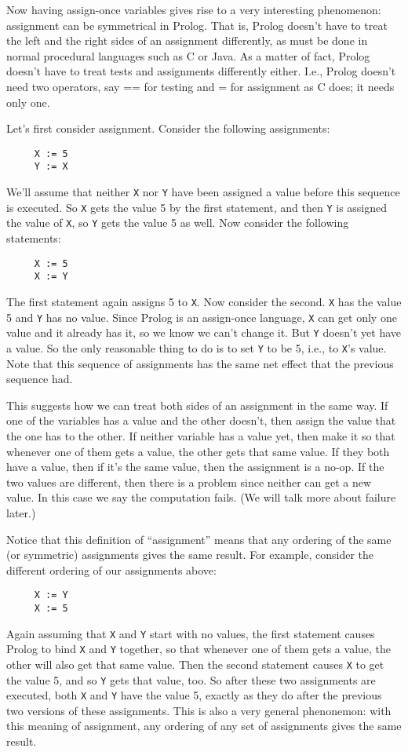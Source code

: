 Now having assign-once variables gives rise to a very interesting
phenomenon: assignment can be symmetrical in Prolog.  That is, Prolog
doesn't have to treat the left and the right sides of an assignment
differently, as must be done in normal procedural languages such as
C or Java.  As a matter of fact, Prolog doesn't have to treat tests
and assignments differently either.  I.e., Prolog doesn't need two
operators, say == for testing and = for assignment as C does; it needs
only one.  

Let's first consider assignment.  Consider the following assignments:
\begin{verbatim}
     X := 5
     Y := X
\end{verbatim}
We'll assume that neither \verb|X| nor \verb|Y| have been assigned a
value before this sequence is executed.  So \verb|X| gets the value 5
by the first statement, and then \verb|Y| is assigned the value of
\verb|X|, so \verb|Y| gets the value 5 as well.  Now consider the
following statements:
\begin{verbatim}
     X := 5
     X := Y
\end{verbatim}
The first statement again assigns 5 to \verb|X|.  Now consider the
second.  \verb|X| has the value 5 and \verb|Y| has no value.  Since
Prolog is an assign-once language, \verb|X| can get only one value and
it already has it, so we know we can't change it.  But \verb|Y|
doesn't yet have a value.  So the only reasonable thing to do is to
set \verb|Y| to be 5, i.e., to \verb|X|'s value.  Note that this
sequence of assignments has the same net effect that the previous
sequence had.

This suggests how we can treat both sides of an assignment in the same
way.  If one of the variables has a value and the other doesn't, then
assign the value that the one has to the other.  If neither variable
has a value yet, then make it so that whenever one of them gets a
value, the other gets that same value.  If they both have a value,
then if it's the same value, then the assignment is a no-op.  If the
two values are different, then there is a problem since neither can
get a new value.  In this case we say the computation fails.  (We will
talk more about failure later.)

Notice that this definition of ``assignment'' means that any ordering
of the same (or symmetric) assignments gives the same result.  For
example, consider the different ordering of our assignments above:
\begin{verbatim}
     X := Y
     X := 5
\end{verbatim}
Again assuming that \verb|X| and \verb|Y| start with no values, the
first statement causes Prolog to bind \verb|X| and \verb|Y| together,
so that whenever one of them gets a value, the other will also get
that same value.  Then the second statement causes \verb|X| to get the
value 5, and so \verb|Y| gets that value, too.  So after these two
assignments are executed, both \verb|X| and \verb|Y| have the value 5,
exactly as they do after the previous two versions of these
assignments.  This is also a very general phenonemon: with this
meaning of assignment, any ordering of any set of assignments gives
the same result.

